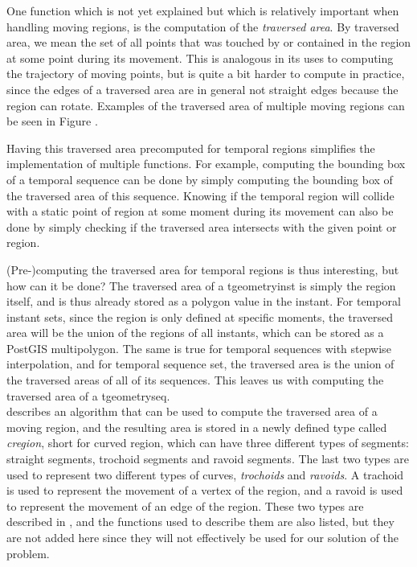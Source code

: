 One function which is not yet explained but which is relatively important when handling moving regions, is the computation of the \textit{traversed area}. By traversed area, we mean the set of all points that was touched by or contained in the region at some point during its movement. This is analogous in its uses to computing the trajectory of moving points, but is quite a bit harder to compute in practice, since the edges of a traversed area are in general not straight edges because the region can rotate. Examples of the traversed area of multiple moving regions can be seen in Figure .


Having this traversed area precomputed for temporal regions simplifies the implementation of multiple functions. For example, computing the bounding box of a temporal sequence can be done by simply computing the bounding box of the traversed area of this sequence. Knowing if the temporal region will collide with a static point of region at some moment during its movement can also be done by simply checking if the traversed area intersects with the given point or region.

(Pre-)computing the traversed area for temporal regions is thus interesting, but how can it be done? The traversed area of a tgeometryinst is simply the region itself, and is thus already stored as a polygon value in the instant. For temporal instant sets, since the region is only defined at specific moments, the traversed area will be the union of the regions of all instants, which can be stored as a PostGIS multipolygon. The same is true for temporal sequences with stepwise interpolation, and for temporal sequence set, the traversed area is the union of the traversed areas of all of its sequences. This leaves us with computing the traversed area of a tgeometryseq. \\

\cite{fmregion} describes an algorithm that can be used to compute the traversed area of a moving region, and the resulting area is stored in a newly defined type called \textit{cregion}, short for curved region, which can have three different types of segments: straight segments, trochoid segments and ravoid segments. The last two types are used to represent two different types of curves, \textit{trochoids} and \textit{ravoids}. A trachoid is used to represent the movement of a vertex of the region, and a ravoid is used to represent the movement of an edge of the region. These two types are described in \cite{fmregion}, and the functions used to describe them are also listed, but they are not added here since they will not effectively be used for our solution of the problem.

